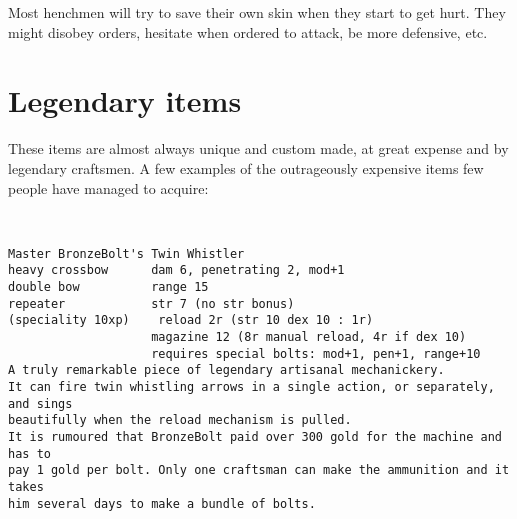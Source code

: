 Most henchmen will try to save their own skin when they start to get hurt. They might disobey orders, hesitate when ordered to attack, be more defensive, etc.









\section*{Legendary items}


These items are almost always unique and custom made, at great expense and by legendary craftsmen. A few examples of the outrageously expensive items few people have managed to acquire:

\

\small \begin{samepage} \begin{verbatim}
Master BronzeBolt's Twin Whistler
heavy crossbow      dam 6, penetrating 2, mod+1
double bow          range 15
repeater            str 7 (no str bonus)
(speciality 10xp)    reload 2r (str 10 dex 10 : 1r)
                    magazine 12 (8r manual reload, 4r if dex 10)
                    requires special bolts: mod+1, pen+1, range+10
A truly remarkable piece of legendary artisanal mechanickery.
It can fire twin whistling arrows in a single action, or separately, and sings
beautifully when the reload mechanism is pulled.
It is rumoured that BronzeBolt paid over 300 gold for the machine and has to
pay 1 gold per bolt. Only one craftsman can make the ammunition and it takes
him several days to make a bundle of bolts.
\end{verbatim} \end{samepage} \normalsize


